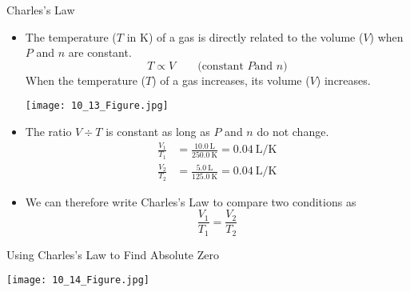 \documentclass[handout]{beamer}
\begin{document}
\begin{frame}[allowframebreaks]{Charles's Law}
		\begin{itemize}
			\item The temperature ($T$ in \si{\kelvin}) of a gas is
				\alert{directly} related to the volume ($V$) when
				$P$ and $n$ are constant.
				\begin{equation*}
					T \propto V \qquad \text{(constant $P$
					and $n$)}
				\end{equation*}
				When the temperature ($T$) of a gas increases,
				its volume ($V$) increases.
					\bigskip
	
					\begin{center}
						\texttt{[image: 10\_13\_Figure.jpg]}
					\end{center}
			\item 	The ratio $V \div T$ is \alert{constant} as long as $P$
				and $n$ \alert{do not change}.
				\begin{align*}
					\frac{V_1}{T_1} &=
					\frac{\SI{10.0}{\liter}}{\SI{250.0}{\kelvin}}
					= \SI{0.04}{\liter\per\kelvin} \\
					\frac{V_2}{T_2} &=
					\frac{\SI{5.0}{\liter}}{\SI{125.0}{\kelvin}}
					= \SI{0.04}{\liter\per\kelvin}
			\end{align*}
			\item We can therefore write Charles's Law to compare two
				conditions as
				\begin{equation*}
					\frac{V_1}{T_1} = \frac{V_2}{T_2}
				\end{equation*}
		\end{itemize}
\end{frame}

\begin{frame}{Using Charles's Law to Find Absolute Zero}
	\begin{center}
		\texttt{[image: 10\_14\_Figure.jpg]}
	\end{center}
\end{frame}
\end{document}
